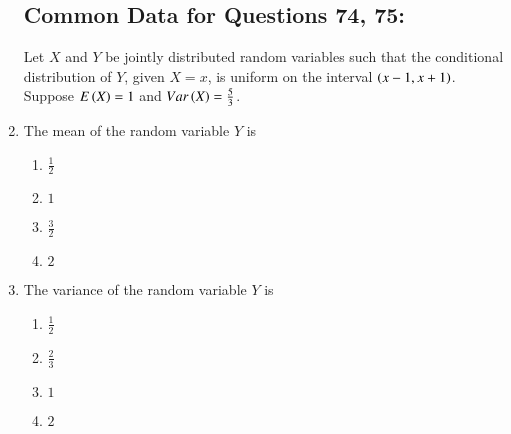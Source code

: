 \documentclass[journal]{IEEEtran}
\begin{document}
\begin{enumerate}
\subsection*{Common Data for Questions 74, 75:}
Let $X$ and $Y$ be jointly distributed random variables such that the conditional distribution of $Y$, given $X = x$, is uniform on the interval $\left(x-1, x+1\right)$. Suppose $E\left(X\right) = 1$ and $Var\left(X\right) = \frac{5}{3}$.
\item The mean of the random variable $Y$ is 
\begin{multicols}{2}
    \begin{enumerate}
        \item $\frac{1}{2}$
        \item $1$
        \item $\frac{3}{2}$
        \item $2$
    \end{enumerate}
\end{multicols}
\item The variance of the random variable $Y$ is
\begin{multicols}{2}
    \begin{enumerate}
        \item $\frac{1}{2}$
        \item $\frac{2}{3}$
        \item $1$
        \item $2$
    \end{enumerate}
\end{multicols}


\end{enumerate}
\end{document}

